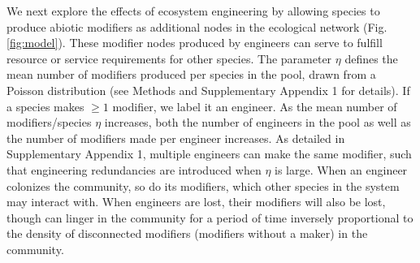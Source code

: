\documentclass[twocolumn,preprintnumbers,amsmath,amssymb,superscriptaddress,linenumbers]{revtex4-1}
\begin{document}
We next explore the effects of ecosystem engineering by allowing species to produce abiotic modifiers as additional nodes in the ecological network (Fig. \ref{fig:model}).
These modifier nodes produced by engineers can serve to fulfill resource or service requirements for other species.
The parameter $\eta$ defines the mean number of modifiers produced per species in the pool, drawn from a Poisson distribution (see Methods and Supplementary Appendix 1 for details).
If a species makes $\geq 1$ modifier, we label it an engineer.
As the mean number of modifiers/species $\eta$ increases, both the number of engineers in the pool as well as the number of modifiers made per engineer increases.
As detailed in Supplementary Appendix 1, multiple engineers can make the same modifier, such that engineering redundancies are introduced when $\eta$ is large.
When an engineer colonizes the community, so do its modifiers, which other species in the system may interact with.
When engineers are lost, their modifiers will also be lost, though can linger in the community for a period of time inversely proportional to the density of disconnected modifiers (modifiers without a maker) in the community.





\end{document}

